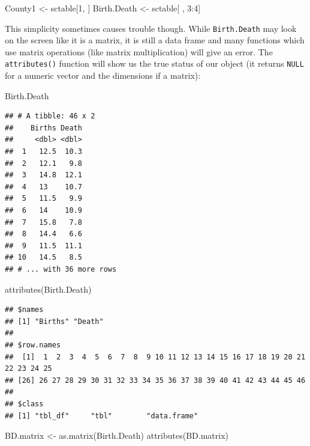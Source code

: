 \documentclass[
]{book}
\newenvironment{Shaded}{\begin{snugshade}}{\end{snugshade}}
\newcommand{\DecValTok}[1]{\textcolor[rgb]{0.00,0.00,0.81}{#1}}
\newcommand{\FunctionTok}[1]{\textcolor[rgb]{0.00,0.00,0.00}{#1}}
\newcommand{\NormalTok}[1]{#1}
\newcommand{\OtherTok}[1]{\textcolor[rgb]{0.56,0.35,0.01}{#1}}
\newcommand{\SpecialCharTok}[1]{\textcolor[rgb]{0.00,0.00,0.00}{#1}}
\begin{document}
\begin{Shaded}
\begin{Highlighting}[]
\NormalTok{County1 }\OtherTok{\textless{}{-}}\NormalTok{ sctable[}\DecValTok{1}\NormalTok{, ]}
\NormalTok{Birth.Death }\OtherTok{\textless{}{-}}\NormalTok{ sctable[ , }\DecValTok{3}\SpecialCharTok{:}\DecValTok{4}\NormalTok{]}
\end{Highlighting}
\end{Shaded}

This simplicity sometimes causes trouble though. While \texttt{Birth.Death} may look on the screen like it is a matrix, it is still a data frame and many functions which use matrix operations (like matrix multiplication) will give an error. The \texttt{attributes()} function will show us the true status of our object (it returns \texttt{NULL} for a numeric vector and the dimensions if a matrix):

\begin{Shaded}
\begin{Highlighting}[]
\NormalTok{Birth.Death}
\end{Highlighting}
\end{Shaded}

\begin{verbatim}
## # A tibble: 46 x 2
##    Births Death
##     <dbl> <dbl>
##  1   12.5  10.3
##  2   12.1   9.8
##  3   14.8  12.1
##  4   13    10.7
##  5   11.5   9.9
##  6   14    10.9
##  7   15.8   7.8
##  8   14.4   6.6
##  9   11.5  11.1
## 10   14.5   8.5
## # ... with 36 more rows
\end{verbatim}

\begin{Shaded}
\begin{Highlighting}[]
\FunctionTok{attributes}\NormalTok{(Birth.Death)}
\end{Highlighting}
\end{Shaded}

\begin{verbatim}
## $names
## [1] "Births" "Death" 
## 
## $row.names
##  [1]  1  2  3  4  5  6  7  8  9 10 11 12 13 14 15 16 17 18 19 20 21 22 23 24 25
## [26] 26 27 28 29 30 31 32 33 34 35 36 37 38 39 40 41 42 43 44 45 46
## 
## $class
## [1] "tbl_df"     "tbl"        "data.frame"
\end{verbatim}

\begin{Shaded}
\begin{Highlighting}[]
\NormalTok{BD.matrix }\OtherTok{\textless{}{-}} \FunctionTok{as.matrix}\NormalTok{(Birth.Death)}
\FunctionTok{attributes}\NormalTok{(BD.matrix)}
\end{Highlighting}
\end{Shaded}
\end{document}
